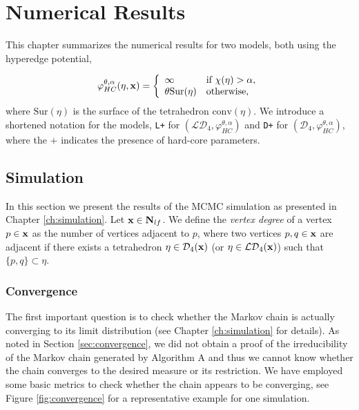 \chapter{Numerical Results}\label{ch:numeric}
This chapter summarizes the numerical results for two models, both using the hyperedge potential, 

\begin{equation}\label{eq:model}
	\varphi_{HC}^{\theta,\alpha}(\eta,{\mathbf{x}}) = 
\left\{
    \begin{array}{ll}
	    \infty & \mbox{if } \chi(\eta) > \alpha, \\
	    \theta \mathrm{Sur}(\eta) & \mbox{otherwise, }
    \end{array}
    \right.
\end{equation}
where $\mathrm{Sur}(\eta)$ is the surface of the tetrahedron $\mathrm{conv}(\eta)$. We introduce a shortened notation for the models, \texttt{L+} for $(\mathcal {LD}_4, \varphi^{\theta,\alpha}_{HC})$ and \texttt{D+} for $(\mathcal D_4, \varphi^{\theta,\alpha}_{HC})$, where the $+$ indicates the presence of hard-core parameters.

 

\section{Simulation}
In this section we present the results of the MCMC simulation as presented in Chapter \ref{ch:simulation}. Let ${\mathbf{x}} \in \mathbf N_{lf}$. We define the \textit{vertex degree} of a vertex $p \in {\mathbf{x}}$ as the number of vertices adjacent to $p$, where two vertices $p,q\in {\mathbf{x}}$ are adjacent if there exists a tetrahedron $\eta \in \mathcal D_4({\mathbf{x}})$ (or $\eta\in\mathcal {LD}_4({\mathbf{x}})$) such that $\{p,q\} \subset \eta$. 

\subsection{Convergence}
The first important question is to check whether the Markov chain is actually converging to its limit distribution (see Chapter \ref{ch:simulation} for details). As noted in Section \ref{sec:convergence}, we did not obtain a proof of the irreducibility of the Markov chain generated by Algorithm A and thus we cannot know whether the chain converges to the desired measure or its restriction. We have employed some basic metrics to check whether the chain appears to be converging, see Figure \ref{fig:convergence} for a representative example for one simulation.

